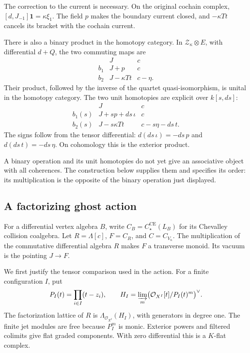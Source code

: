 The correction to the current is necessary.
On the original cochain complex,
$[d,J_{-1}]\mathbf1=\kappa\xi_1$.
The field $p$ makes the boundary current closed, and
$-\kappa Tt$ cancels its bracket with the cochain current.

There is also a binary product in the homotopy category.
In $\mathcal Z_\kappa\otimes E$, with differential $d+Q$,
the two commuting maps are
\[
 \begin{array}{c|cc}
 &J&c\\ \hline
 b_1&J+p&c\\
 b_2&J-\kappa Tt&c-\eta.
 \end{array}
\]
Their product, followed by the inverse of the quartet
quasi-isomorphism, is unital in the homotopy category.
The two unit homotopies are explicit over $k[s,ds]$:
\[
 \begin{array}{c|cc}
 &J&c\\ \hline
 b_1(s)&J+sp+ds\,\iota&c\\
 b_2(s)&J-s\kappa Tt&c-s\eta-ds\,t.
 \end{array}
\]
The signs follow from the tensor differential:
$d(ds\,\iota)=-ds\,p$ and $d(ds\,t)=-ds\,\eta$.
On cohomology this is the exterior product.

A binary operation and its unit homotopies do not yet give
an associative object with all coherences. The construction
below supplies them and specifies its order: its multiplication
is the opposite of the binary operation just displayed.

\subsection{A factorizing ghost action}

For a differential vertex algebra $B$, write
$C_B=C^{\mathrm{CE}}_\star(L_B)$ for its Chevalley collision
coalgebra. Let $R=\Lambda[c]$, $F=C_R$, and $C=C_{V_\kappa}$.
The multiplication of the commutative differential algebra $R$
makes $F$ a transverse monoid. Its vacuum is the pointing
$J\to F$.

We first justify the tensor comparison used in the action.
For a finite configuration $I$, put
\[
 P_I(t)=\prod_{i\in I}(t-z_i),\qquad
 H_I=\varinjlim_m
 \bigl(\mathcal O_{X^I}[t]/P_I(t)^m\bigr)^\vee.
\]
The factorization lattice of $R$ is
$\Lambda_{\mathcal O_{X^I}}(H_I)$, with generators in degree one.
The finite jet modules are free because $P_I^m$ is monic.
Exterior powers and filtered colimits give flat graded
components. With zero differential this is a $K$-flat complex.

